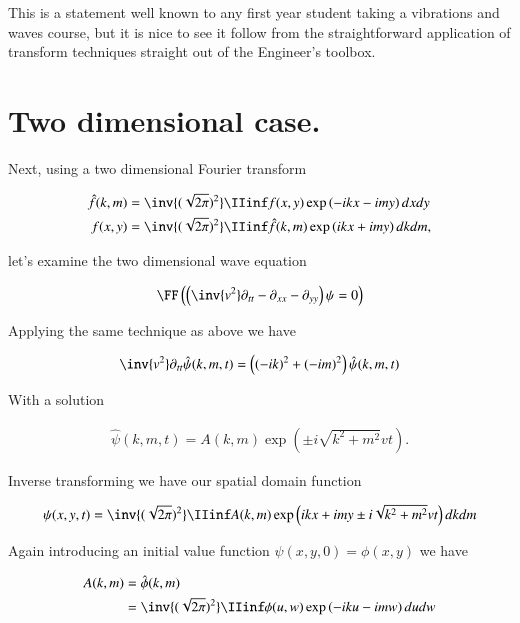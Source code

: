 This is a statement well known to any first year student taking a vibrations and waves course, but it is nice to see 
it follow from the straightforward application of transform techniques straight out of the Engineer's toolbox.

\section{Two dimensional case. }

Next, using a two dimensional Fourier transform

\begin{align*}
\hat{f}(k,m) &= \inv{(\sqrt{2\pi})^2} \IIinf f(x,y) \exp\left( -i k x - i m y \right) dx dy \\
{f}(x,y) &= \inv{(\sqrt{2\pi})^2} \IIinf \hat{f}(k,m) \exp\left( i k x + i m y \right) dk dm,
\end{align*}

let's examine the two dimensional wave equation

\begin{align*}
\FF\left( \left(\inv{v^2} \partial_{tt} -\partial_{xx} -\partial_{yy} \right)\psi = 0 \right)
\end{align*}

Applying the same technique as above we have

\begin{align*}
\inv{v^2}\partial_{tt}\hat{\psi}(k,m,t) = \left((-i k)^2 + (-i m)^2\right) \hat{\psi}(k,m,t)
\end{align*}

With a solution 

\begin{align*}
\hat{\psi}(k,m,t) = A(k,m) \exp\left( \pm i \sqrt{k^2 + m^2} v t \right).
\end{align*}

Inverse transforming we have our spatial domain function

\begin{align*}
{\psi}(x,y,t) = \inv{(\sqrt{2\pi})^2} \IIinf A(k,m) \exp\left( i k x + i m y \pm i \sqrt{k^2 + m^2} v t \right) dk dm
\end{align*}

Again introducing an initial value function $\psi(x,y,0) = \phi(x,y)$ we have

\begin{align*}
A(k,m) 
&= \hat{\phi}(k,m) \\
&= \inv{(\sqrt{2\pi})^2} \IIinf \phi(u,w) \exp\left( -i k u - i m w \right) du dw
\end{align*}

